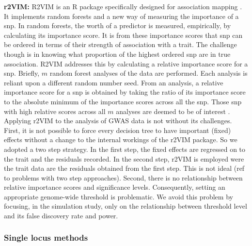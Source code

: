 \documentclass{nature}
\begin{document}
\textbf{r2VIM:} R2VIM is an R package specifically designed for association mapping \cite{szymczak2016r2vim}. 
It implements random forests and a new way of measuring the importance of a snp.  In random forests, the worth of a predictor is measured, empirically, by calculating its importance score. It is from these importance scores that snp can be ordered in terms of their strength of association with a trait. The challenge though is in knowing what proportion of the 
highest ordered snp are in true association. R2VIM addresses this by calculating a relative importance score for a snp. Briefly,
$m$ random forest analyses of the data are performed. Each analysis is reliant upon a different random number seed. 
From an analysis, a relative importance score for a snp is obtained by taking the ratio of its importance score to the absolute 
minimum of the importance scores across all the snp.  Those 
snp with high relative scores across all $m$ analyses are deemed to be of interest \cite{szymczak2016r2vim}.
Applying r2VIM to the analysis of GWAS data is not without its challenges.  First, it is not possible to force every 
decision tree to have important (fixed) effects without a change to the internal workings of the r2VIM package. 
So we adopted a two step 
strategy. In the first step, the fixed effects are regressed on to the trait and the residuals recorded.  In the second step, 
r2VIM is employed were the trait data are the residuals obtained from the first step. This is not ideal (ref to problems with two
step approaches).  Second, there is no relationship between relative importance scores and significance levels. Consequently, 
setting an appropriate genome-wide threshold is problematic. We avoid this problem by focusing, in the simulation study, 
only on the relationship between threshold level and its false discovery rate and power. 

\subsubsection{Single locus methods}
\end{document}
